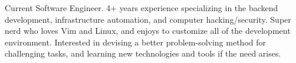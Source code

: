 

\begin{cvparagraph}

Current Software Engineer. 4+ years experience specializing in the backend development, infrastructure automation, and computer hacking/security. Super nerd who loves Vim and Linux, and enjoys to customize all of the development environment. Interested in devising a better problem-solving method for challenging tasks, and learning new technologies and tools if the need arises.
\end{cvparagraph}

